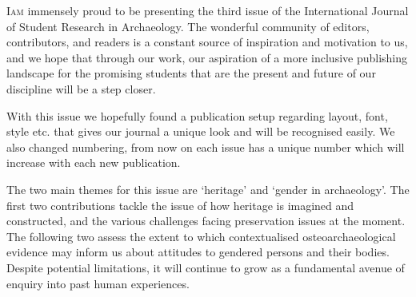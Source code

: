 \def\IJSRAidentifier{\currfilebase} %
\def\shorttitle{Issue Presentation}
\def\maintitle{Presentation of the First Issue of IJSRA in 2017}
\def\cmail{gonzalo.linaresmatas@st-hughs.ox.ac.uk}
\def\authorone{Gonzalo Linares Matás}
\def\bioone{\href{https://oxford.academia.edu/GonzaloLinaresMatás}{\authorone}  has just finished a BA Archaeology \& Anthropology at St Hugh’s College, University of Oxford (UK). He is starting a Research Master’s in Human Evolution and Palaeolithic Archaeology at the University of Leiden (The Netherlands), focusing on vertebrate taphonomy, early bone technologies, and faunal analysis. He was the former President of the Oxford University Archaeology Society (Michaelmas 2015), and he has recently been invited to join the WAC (World Archaeology Congress) Student Committee. 

He is particularly interested in the socio-political contexts of heritage management and ownership, contemporary archaeological theory, and the histories of the academic disciplines of archaeology and anthropology as practical modes of inquiry. He is also very interested in transforming the academic publishing landscape.}
\def\affilone{Executive Editor, International Journal of Student Research in Archaeology
\\St. Hugh’s College, University of Oxford}


\IJSRAopening%
\lettrine{I}{am} immensely proud to be presenting the third issue of the International Journal of Student Research in Archaeology. The wonderful community of editors, contributors, and readers is a constant source of inspiration and motivation to us, and we hope that through our work, our aspiration of a more inclusive publishing landscape for the promising students that are the present and future of our discipline will be a step closer.

With this issue we hopefully found a publication setup regarding layout, font, style etc. that gives our journal a unique look and will be recognised easily. 
We also changed numbering, from now on each issue has a unique number which will increase with each new publication.


The two main themes for this issue are ‘heritage’ and ‘gender in archaeology’. The first two contributions tackle the issue of how heritage is imagined and constructed, and the various challenges facing preservation issues at the moment. The following two assess the extent to which contextualised osteoarchaeological evidence may inform us about attitudes to gendered persons and their bodies. Despite potential limitations, it will continue to grow as a fundamental avenue of enquiry into past human experiences.

